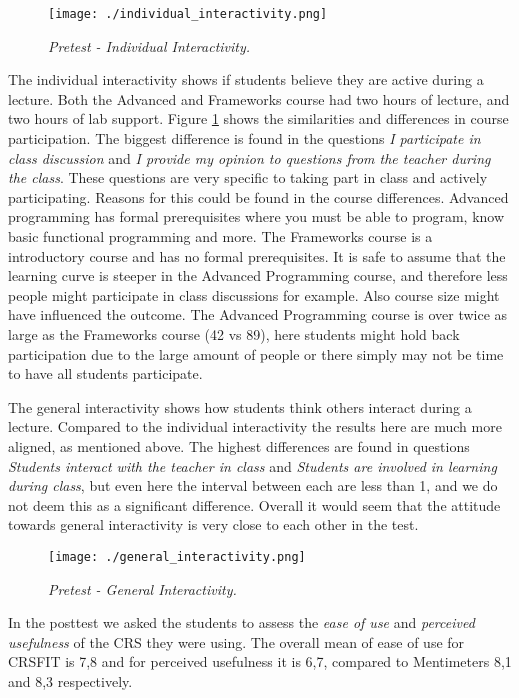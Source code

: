  \begin{figure}[H]
  \centering
     \texttt{[image: ./individual\_interactivity.png]}
     \caption{\emph{Pretest - Individual Interactivity.}}
     \label{fig:individual_interactivity}
 \end{figure}

The individual interactivity shows if students believe they are active during a lecture. Both the Advanced and Frameworks course had two hours of lecture, and two hours of lab support. Figure \ref{fig:individual_interactivity} shows the similarities and differences in course participation. The biggest difference is found in the questions \emph{I participate in class discussion} and \emph{I provide my opinion to questions from the teacher during the class}. These questions are very specific to taking part in class and actively participating. Reasons for this could be found in the course differences. Advanced programming has formal prerequisites where you must be able to program, know basic functional programming and more. The Frameworks course is a introductory course and has no formal prerequisites. It is safe to assume that the learning curve is steeper in the Advanced Programming course, and therefore less people might participate in class discussions for example. Also course size might have influenced the outcome. The Advanced Programming course is over twice as large as the Frameworks course (42 vs 89), here students might hold back participation due to the large amount of people or there simply may not be time to have all students participate.

The general interactivity shows how students think others interact during a lecture. Compared to the individual interactivity the results here are much more aligned, as mentioned above. The highest differences are found in questions \emph{Students interact with the teacher in class} and \emph{Students are involved in learning during class}, but even here the interval between each are less than 1, and we do not deem this as a significant difference. Overall it would seem that the attitude towards general interactivity is very close to each other in the test. 

 \begin{figure}[H]
  \centering
     \texttt{[image: ./general\_interactivity.png]}
     \caption{\emph{Pretest - General Interactivity.}}
     \label{fig:general_interactivity}
 \end{figure}


In the posttest we asked the students to assess the \emph{ease of use} and \emph{perceived usefulness} of the CRS they were using. The overall mean of ease of use for CRSFIT is 7,8 and for perceived usefulness it is 6,7, compared to Mentimeters 8,1 and 8,3 respectively.

